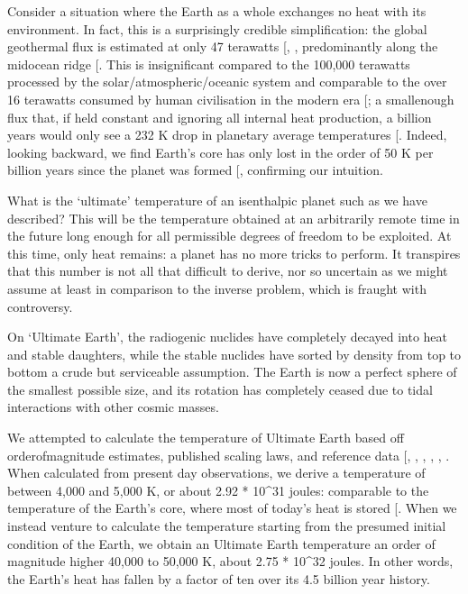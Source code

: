 \documentclass[letterpaper,10pt,english]{jupyterBook}
\begin{document}
\sphinxAtStartPar
Consider a situation where the Earth as a whole exchanges no heat with its environment. In fact, this is a surprisingly credible simplification: the global geothermal flux is estimated at only 47 terawatts {[}, \sphinxcite{references:id762}{]}, predominantly along the mid\sphinxhyphen{}ocean ridge {[}\sphinxcite{references:id430}{]}. This is insignificant compared to the 100,000 terawatts processed by the solar/atmospheric/oceanic system and comparable to the over 16 terawatts consumed by human civilisation in the modern era {[}\sphinxcite{references:id109}{]}; a small\sphinxhyphen{}enough flux that, if held constant and ignoring all internal heat production, a billion years would only see a 232 K drop in planetary average temperatures {[}\sphinxcite{references:id498}{]}. Indeed, looking backward, we find Earth’s core has only lost in the order of 50 K per billion years since the planet was formed {[}\sphinxcite{references:id107}{]}, confirming our intuition.

\sphinxAtStartPar
What is the ‘ultimate’ temperature of an isenthalpic planet such as we have described? This will be the temperature obtained at an arbitrarily remote time in the future \sphinxhyphen{} long enough for all permissible degrees of freedom to be exploited. At this time, only heat remains: a planet has no more tricks to perform. It transpires that this number is not all that difficult to derive, nor so uncertain as we might assume \sphinxhyphen{} at least in comparison to the inverse problem, which is fraught with controversy.

\sphinxAtStartPar
On ‘Ultimate Earth’, the radiogenic nuclides have completely decayed into heat and stable daughters, while the stable nuclides have sorted by density from top to bottom \sphinxhyphen{} a crude but serviceable assumption. The Earth is now a perfect sphere of the smallest possible size, and its rotation has completely ceased due to tidal interactions with other cosmic masses.

\sphinxAtStartPar
We attempted to calculate the temperature of Ultimate Earth based off order\sphinxhyphen{}of\sphinxhyphen{}magnitude estimates, published scaling laws, and reference data {[}, , , , , \sphinxcite{references:id105}{]}. When calculated from present day observations, we derive a temperature of between 4,000 and 5,000 K, or about  2.92 * 10\textasciicircum{}31 joules: comparable to the temperature of the Earth’s core, where most of today’s heat is stored {[}\sphinxcite{references:id104}{]}. When we instead venture to calculate the temperature starting from the presumed initial condition of the Earth, we obtain an Ultimate Earth temperature an order of magnitude higher \sphinxhyphen{} 40,000 to 50,000 K, about 2.75 * 10\textasciicircum{}32 joules. In other words, the Earth’s heat has fallen by a factor of ten over its 4.5 billion year history.
\end{document}
